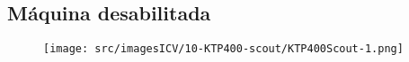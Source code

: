 \thispagestyle{fancy}
\vspace{\fill}

\subsection{\small Máquina desabilitada}
\begin{figure}
    \centering
    \texttt{[image: src/imagesICV/10-KTP400-scout/KTP400Scout-1.png]}
\end{figure}
